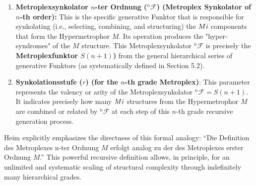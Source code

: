 \documentclass[12pt]{article}
\newcommand{\q}[1]{\enquote{#1}}
\def\metroplex#1#2{M}%
\newcommand{\hypersyntrix}{\metroplex{1}{F}}
\newcommand{\hypermetrophor}[1]{%
  \metroplex{#1}{a}%
}
\newcommand{\metroplexsynkolator}[1]{{}^{#1}\mathcal{F}}
\newcommand{\metroplexfunktor}{S}
\begin{document}
\begin{itemize}
\begin{enumerate}
        \item \textbf{Metroplexsynkolator \( n \)-ter Ordnung (\( \metroplexsynkolator{n}{} \)) (Metroplex Synkolator of \( n \)-th order):} This is the specific generative Funktor that is responsible for synkolating (i.e., selecting, combining, and structuring) the \( \metroplex{n-1}_i \) components that form the Hypermetrophor \( \hypermetrophor{n-1}{} \). Its operation produces the "hyper-syndromes" of the \( \metroplex{n}{} \) structure. This Metroplexsynkolator \( \metroplexsynkolator{n}{} \) is precisely the \textbf{Metroplexfunktor \( \metroplexfunktor(n+1) \))} from the general hierarchical series of generative Funktors (as systematically defined in Section 5.2).
        \item \textbf{Synkolationsstufe (\( r \)) (for the \(n\)-th grade Metroplex)}: This parameter represents the valency or arity of the Metroplexsynkolator \( \metroplexsynkolator{n}{} = \metroplexfunktor(n+1) \). It indicates precisely how many \( \metroplex{n-1}_i \) structures from the Hypermetrophor \( \hypermetrophor{n-1}{} \) are combined or related by \( \metroplexsynkolator{n}{} \) at each step of this \( n \)-th grade recursive generation process.
    \end{enumerate}
    Heim explicitly emphasizes the directness of this formal analogy: \q{Die Definition des Metroplexes n-ter Ordnung \( \metroplex{n}{} \) erfolgt analog zu der des Metroplexes erster Ordnung \( \hypersyntrix \).} This powerful recursive definition allows, in principle, for an unlimited and systematic scaling of structural complexity through indefinitely many hierarchical grades.


\end{itemize}
\end{document}
